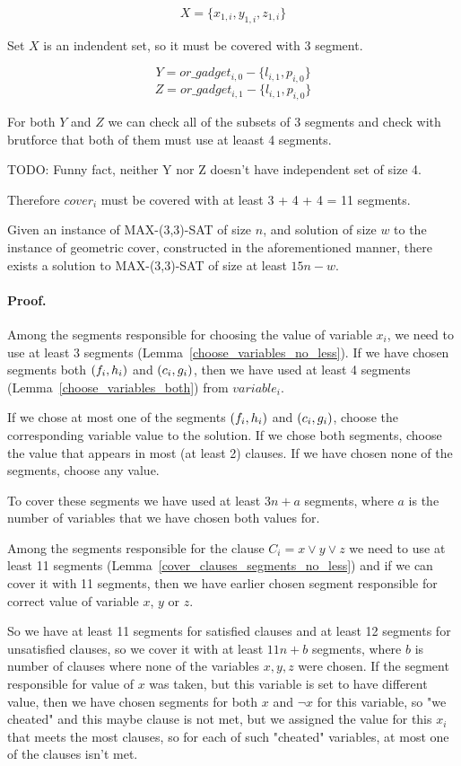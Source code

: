 $$X = \{x_{1, i}, y_{1, i}, z_{1, i}\}$$

Set $X$ is an indendent set, so it must be covered with 3 segment.

$$Y = or\_gadget_{i, 0} - \{l_{i, 1}, p_{i, 0}\}$$
$$Z = or\_gadget_{i, 1} - \{l_{i, 1}, p_{i, 0}\}$$


For both $Y$ and $Z$ we can check all of the subsets of 3 segments and
check with brutforce that both of them must use at leaast 4 segments.

TODO: Funny fact, neither Y nor Z doesn't have independent set of size 4.

Therefore $cover_i$ must be covered with at least 3 + 4 + 4 = 11 segments.

\begin{lemma}
	\label{construction_completness}
	Given an instance of MAX-(3,3)-SAT of size $n$,
	and solution of size $w$ to the instance of geometric cover,
	constructed in the aforementioned manner, 
	there exists a solution to MAX-(3,3)-SAT of size at least $15n - w$.
\end{lemma}
\paragraph{Proof.}
Among the segments responsible for choosing the value of variable $x_i$,
we need to use at least 3 segments (Lemma~\ref{choose_variables_no_less}).
If we have chosen segments both $(f_i, h_i)$ and $(c_i, g_i)$,
then we have used at least 4 segments (Lemma~\ref{choose_variables_both})
from $variable_i$.

If we chose at most one of the segments $(f_i, h_i)$ and $(c_i, g_i)$,
choose the corresponding variable value to the solution.
If we chose both segments,
choose the value that appears in most (at least 2) clauses.
If we have chosen none of the segments, choose any value.

To cover these segments we have used at least $3n + a$ segments,
where $a$ is the number of variables that we have chosen both
values for.

Among the segments responsible for the clause $C_i = x \lor y \lor z$
we need to use at least 11 segments
(Lemma~\ref{cover_clauses_segments_no_less})
and if we can cover it with 11 segments, then we have 
earlier chosen
segment responsible for correct value of variable $x$, $y$ or $z$.

So we have at least 11 segments for satisfied clauses
and at least 12 segments
for unsatisfied clauses, so we cover it with 
at least $11n + b$ segments, where $b$ is number of clauses
where none of the variables $x, y, z$ were chosen.
If the segment responsible for value of $x$ was taken,
but this variable is set to have different value,
then we have chosen segments for both $x$ and $\neg x$ for this variable,
so "we cheated" and this maybe clause is not met,
but we assigned the value for this $x_i$ that meets
the most clauses, so for each of such "cheated" variables,
at most one of the clauses isn't met.

